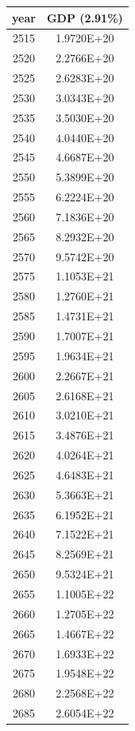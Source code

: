 \documentclass[a4paper]{article}
\begin{document}
	\begin{tabular}{|c|c|}
		\hline
		year & GDP (2.91\%) \\
		\hline
		2515 & 1.9720E+20 \\
		\hline
		2520 & 2.2766E+20 \\
		\hline
		2525 & 2.6283E+20 \\
		\hline
		2530 & 3.0343E+20 \\
		\hline
		2535 & 3.5030E+20 \\
		\hline
		2540 & 4.0440E+20 \\
		\hline
		2545 & 4.6687E+20 \\
		\hline
		2550 & 5.3899E+20 \\
		\hline
		2555 & 6.2224E+20 \\
		\hline
		2560 & 7.1836E+20 \\
		\hline
		2565 & 8.2932E+20 \\
		\hline
		2570 & 9.5742E+20 \\
		\hline
		2575 & 1.1053E+21 \\
		\hline
		2580 & 1.2760E+21 \\
		\hline
		2585 & 1.4731E+21 \\
		\hline
		2590 & 1.7007E+21 \\
		\hline
		2595 & 1.9634E+21 \\
		\hline
		2600 & 2.2667E+21 \\
		\hline
		2605 & 2.6168E+21 \\
		\hline
		2610 & 3.0210E+21 \\
		\hline
		2615 & 3.4876E+21 \\
		\hline
		2620 & 4.0264E+21 \\
		\hline
		2625 & 4.6483E+21 \\
		\hline
		2630 & 5.3663E+21 \\
		\hline
		2635 & 6.1952E+21 \\
		\hline
		2640 & 7.1522E+21 \\
		\hline
		2645 & 8.2569E+21 \\
		\hline
		2650 & 9.5324E+21 \\
		\hline
		2655 & 1.1005E+22 \\
		\hline
		2660 & 1.2705E+22 \\
		\hline
		2665 & 1.4667E+22 \\
		\hline
		2670 & 1.6933E+22 \\
		\hline
		2675 & 1.9548E+22 \\
		\hline
		2680 & 2.2568E+22 \\
		\hline
		2685 & 2.6054E+22 \\

\end{tabular}
\end{document}
